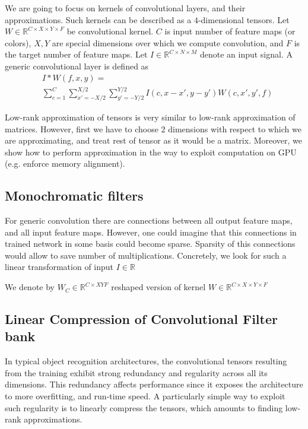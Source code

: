\documentclass{article}
\begin{document}
We are going to focus on kernels of convolutional layers, and their approximations. 
Such kernels can be described as a $4$-dimensional tensors. Let $W \in \mathbb{R}^{C \times X \times Y \times F}$ 
be convolutional kernel. 
$C$ is input number of feature maps (or colors), $X, Y$ are special dimensions
over which we compute convolution, and $F$ is the target number of feature maps.
Let $I \in \mathbb{R}^{C \times N \times M}$ denote an input signal.
A generic convolutional layer is defined as
\begin{align*}
\label{convlayereq}
&I \ast W (f,x,y) = \\
&\sum_{c=1}^C \sum_{x'=-X/2}^{X/2} \sum_{y'=-Y/2}^{Y/2} I(c,x-x',y-y') W(c,x',y',f)
\end{align*}

Low-rank approximation of tensors is very similar to low-rank approximation of matrices.
However, first we have to choose $2$ dimensions with respect to which we are approximating, and treat
rest of tensor as it would be a matrix. Moreover, we show how to perform approximation in the way to
exploit computation on GPU (e.g. enforce memory alignment).


\subsection{Monochromatic filters}
For generic convolution there are connections between all output feature maps, and all input feature maps.
However, one could imagine that this connections in trained network in some basis could become sparse. 
Sparsity of this connections would allow to save number of multiplications. Concretely, we look for such a 
linear transformation of input $I \in \mathbb{R}$ 




We denote by $W_C \in \mathbb{R}^{C \times XYF}$ reshaped version of kernel $W \in \mathbb{R}^{C \times X \times Y \times F}$



\subsection{Linear Compression of Convolutional Filter bank}

In typical object recognition architectures, the convolutional tensors resulting
from the training exhibit strong redundancy and regularity across all its 
dimensions. This redundancy affects performance since it exposes
the architecture to more overfitting, and run-time speed. 
A particularly simple way to exploit such regularity is to 
linearly compress the tensors, which amounts to finding low-rank 
approximations.
\end{document}
